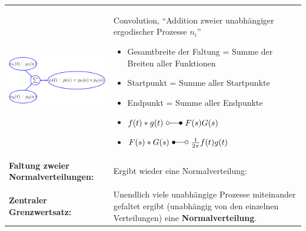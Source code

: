 		\begin{tabularx}{\textwidth}{lX}
			\parbox{5cm}{
				\includegraphics[width=5cm]{./bilder/faltung.png}
			}
			& 	\parbox{13cm}{
				Convolution, ``Addition zweier unabhängiger ergodischer Prozesse $n_i$'' \\
				 \\
				
				\begin{itemize}
					\item Gesamtbreite der Faltung = Summe der Breiten aller Funktionen
					\item Startpunkt = Summe aller Startpunkte
					\item Endpunkt = Summe aller Endpunkte
					\item $f(t) * g(t) \ \laplace \ F(s) G(s)$
					\item $F(s) * G(s) \ \Laplace \ \frac{1}{2 \pi} f(t) g(t)$
				\end{itemize}
			}
			\\
			\textbf{Faltung zweier Normalverteilungen:}
			&
			Ergibt wieder eine Normalverteilung: \newline
			\\ & \\
			\textbf{Zentraler Grenzwertsatz:}
			&	Unendlich viele unabhängige Prozesse miteinander gefaltet ergibt
			(unabhängig von den einzelnen Verteilungen) eine \textbf{Normalverteilung}.
		\end{tabularx}
	
	\newpage
